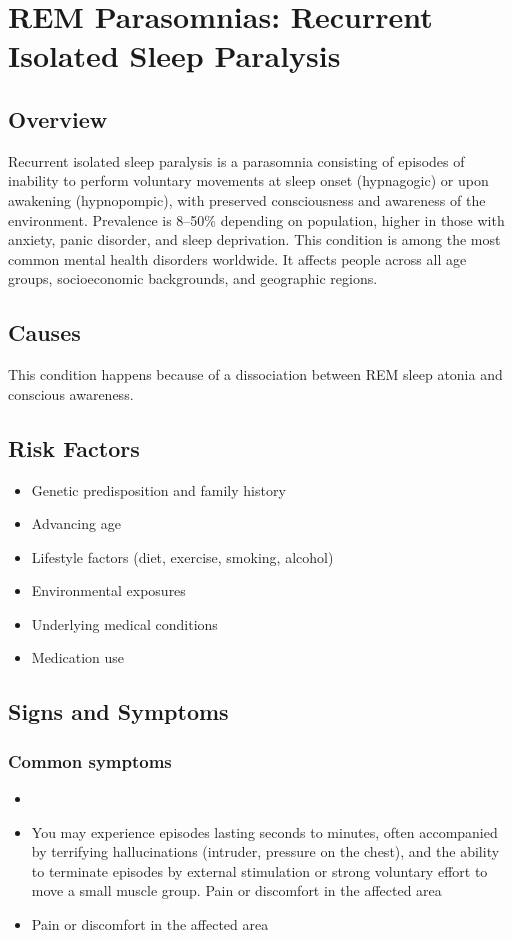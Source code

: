 \chapter{REM Parasomnias: Recurrent Isolated Sleep Paralysis}
\label{sec:Recurrent Isolated Sleep Paralysis}

\section{Overview}
Recurrent isolated sleep paralysis is a parasomnia consisting of episodes of inability to perform voluntary movements at sleep onset (hypnagogic) or upon awakening (hypnopompic), with preserved consciousness and awareness of the environment. Prevalence is 8--50\% depending on population, higher in those with anxiety, panic disorder, and sleep deprivation. This condition is among the most common mental health disorders worldwide. It affects people across all age groups, socioeconomic backgrounds, and geographic regions.
\section{Causes}
This condition happens because of a dissociation between REM sleep atonia and conscious awareness.     
\section{Risk Factors}

\begin{itemize}[noitemsep]
  \item Genetic predisposition and family history
  \item Advancing age
  \item Lifestyle factors (diet, exercise, smoking, alcohol)
  \item Environmental exposures
  \item Underlying medical conditions
  \item Medication use
\end{itemize}
\section{Signs and Symptoms}

\subsection{Common symptoms}
\begin{itemize}[noitemsep]
  \item \item You may experience episodes lasting seconds to minutes, often accompanied by terrifying hallucinations (intruder, pressure on the chest), and the ability to terminate episodes by external stimulation or strong voluntary effort to move a small muscle group. Pain or discomfort in the affected area    \item Pain or discomfort in the affected area
  \end{itemize}

